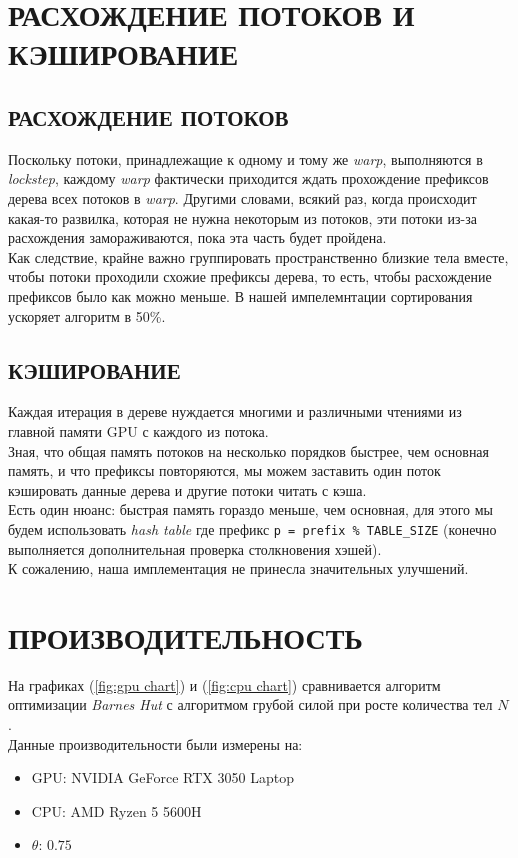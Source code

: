 \documentclass{article}
\renewcommand{\baselinestretch}{1.5}
\begin{document}
\pagebreak
\section{РАСХОЖДЕНИЕ ПОТОКОВ И КЭШИРОВАНИЕ}
\subsection{РАСХОЖДЕНИЕ ПОТОКОВ}

Поскольку потоки, принадлежащие к одному и тому же \textit{warp}, выполняются в \textit{lockstep}, каждому \textit{warp} фактически приходится ждать прохождение префиксов дерева всех потоков в \textit{warp}. Другими словами, всякий раз, когда происходит какая-то развилка, которая не нужна некоторым из потоков, эти потоки из-за расхождения замораживаются, пока эта часть будет пройдена.\\
Как следствие, крайне важно группировать пространственно близкие тела вместе, чтобы потоки проходили схожие префиксы дерева, то есть, чтобы расхождение префиксов было как можно меньше.
В нашей импелемнтации сортирования ускоряет алгоритм в 50\%.

\vspace{2\baselinestretch pt}
\subsection{КЭШИРОВАНИЕ}
Каждая итерация в дереве нуждается многими и различными чтениями из главной памяти GPU с каждого из потока.\\
Зная, что общая память потоков на несколько порядков быстрее, чем основная память, и что префиксы повторяются, мы можем заставить один поток кэшировать данные дерева и другие потоки читать с кэша.\\
Есть один нюанс: быстрая память гораздо меньше, чем основная, для этого мы будем использовать \textit{hash table} где префикс \texttt{p = prefix \% TABLE\_SIZE} (конечно выполняется дополнительная проверка столкновения хэшей).\\
К сожалению, наша имплементация не принесла значительных улучшений.

\pagebreak
\section{ПРОИЗВОДИТЕЛЬНОСТЬ}
На графиках (\ref{fig:gpu chart}) и (\ref{fig:cpu chart}) сравнивается алгоритм оптимизации \textit{Barnes Hut} с алгоритмом грубой силой при росте количества тел $N$.\\
Данные производительности были измерены на:
\begin{itemize}
\item GPU: NVIDIA GeForce RTX 3050 Laptop
\item CPU: AMD Ryzen 5 5600H
\item $\theta$: $0.75$
\end{itemize}
\end{document}
